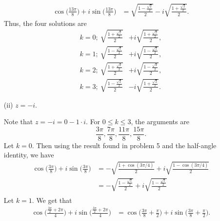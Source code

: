 \documentclass[a4paper]{article}
\begin{document}
\begin{enumerate}
\begin{solution}
        \begin{align*}
            \cos \Big(  \frac{  13 \pi  }{ 8 }   \Big) + i \sin \Big(  \frac{ 13 \pi  }{ 8 }  \Big) &= \sqrt{ \frac{ 1 - \frac{ \sqrt{ 2 }  }{ 2 }  }{ 2 }  }  - i \sqrt{ \frac{ 1 + \frac{ \sqrt{ 2 }  }{ 2 }  }{ 2 }  }.
        \end{align*}
        Thus, the four solutions are
        \begin{align*}
            k = 0;  \ \sqrt{ \frac{ 1 + \frac{ \sqrt{ 2 }  }{ 2 }  }{ 2 }  }  &+ i \sqrt{ \frac{ 1 + \frac{ \sqrt{ 2 }  }{ 2 }  }{ 2 }   },  \\
           k = 1; \  \sqrt{ \frac{ 1 - \frac{ \sqrt{ 2 }  }{ 2 }  }{ 2 }  }  &+ i \sqrt{ \frac{ 1 - \frac{ \sqrt{ 2 }  }{ 2 }  }{ 2 }  }, \\ 
           k= 2; \ \sqrt{ \frac{ 1 + \frac{ \sqrt{ 2 }  }{ 2 }  }{ 2 }  }  &+ i \sqrt{ \frac{ 1 - \frac{ \sqrt{ 2 }  }{ 2 }  }{ 2 }  }, \\
           k=3; \ \sqrt{ \frac{ 1 - \frac{ \sqrt{ 2 }  }{ 2 }  }{ 2 }   }  &- i \sqrt{ \frac{ 1 + \frac{ \sqrt{ 2 }  }{ 2 }  }{ 2 }  }.
        \end{align*}
                \end{solution}
            \item[(ii)] \( z = -i \).
                \begin{solution}
                Note that \( z = - i = 0 - 1 \cdot i  \). For \( 0 \leq k \leq 3  \), the arguments are
                \[  \frac{ 3 \pi  }{ 8  }, \frac{ 7 \pi   }{ 8  }, \frac{ 11 \pi  }{ 8 }, \frac{ 15 \pi  }{ 8 }.  \]
                Let \( k = 0  \). Then using the result found in problem 5 and the half-angle identity, we have
                \begin{align*}
                    \cos \Big(  \frac{ 3 \pi  }{ 8  }  \Big) + i \sin \Big(  \frac{ 3 \pi  }{ 8  }  \Big) &= - \sqrt{ \frac{ 1 + \cos(3 \pi /4) }{ 2 }  }  + i \sqrt{ \frac{ 1 - \cos (3 \pi /4 ) }{ 2 }  }    \\
                                                                                                          &= - \sqrt{ \frac{ 1 - \frac{ \sqrt{ 2 }  }{ 2 }  }{ 2 }  }  + i \sqrt{ \frac{ 1 -  \frac{ \sqrt{ 2 }  }{ 2 } }{ 2 }  }    \\ 
                \end{align*}
                Let \( k = 1  \). We get that  
                \begin{align*}
                    \cos \Big(  \frac{ \frac{ 3 \pi }{ 2 } + 2 \pi }{ 4  }  \Big) + i \sin \Big(  \frac{ \frac{ 3 \pi }{ 2 }  + 2 \pi }{ 4 }  \Big) &= \cos \Big(  \frac{ 3 \pi  }{ 8  } + \frac{ \pi }{ 2 }  \Big) + i \sin \Big(  \frac{ 3 \pi }{ 8 }  + \frac{ \pi }{ 2 }  \Big). 

\end{align*}
\end{solution}
\end{enumerate}
\end{document}
